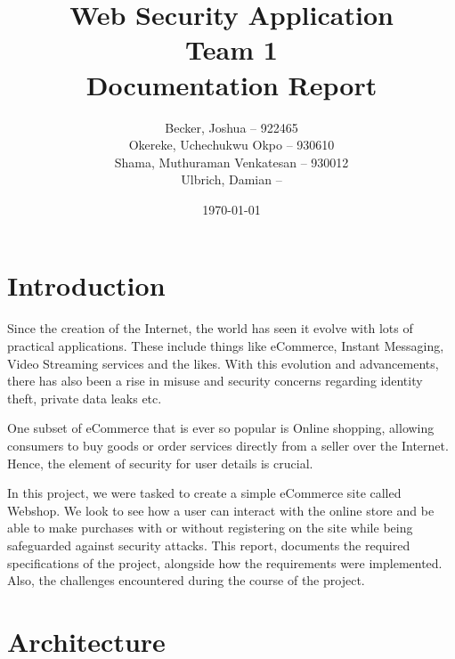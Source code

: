 \documentclass[12pt,a4paper]{article}
\begin{document}
	
	\title{\textbf{Web Security Application\\
		Team 1\\
		Documentation Report} 	\vspace{50mm}}

	


 \author{Becker, Joshua -- 922465\\ Okereke, Uchechukwu Okpo -- 930610\\ Shama, Muthuraman Venkatesan -- 930012\\ Ulbrich, Damian -- }
	
	
	\date{\vspace{50mm} \today}
	\maketitle
	\thispagestyle{empty}
	\clearpage
	
	
	\tableofcontents
	\thispagestyle{empty}
	\clearpage
	
	\section{Introduction}
	
	Since the creation of the Internet, the world has seen it evolve with lots of practical applications. These include things like eCommerce, Instant Messaging, Video Streaming services and the likes. With this evolution and advancements, there has also been a rise in misuse and security concerns regarding identity theft, private data leaks etc.
	
		
	One subset of eCommerce that is ever so popular is Online shopping, allowing consumers to buy goods or order services directly from a seller over the Internet. Hence, the element of security for user details is crucial.
	
	
	In this project, we were tasked to create a simple eCommerce site called Webshop. We look to see how a user can interact with the online store and be able to make purchases with or without registering on the site while being safeguarded against security attacks. This report, documents the required specifications of the project, alongside how the requirements were implemented. Also, the challenges encountered during the course of the project.
	
		
	\section{Architecture}
	
\end{document}
